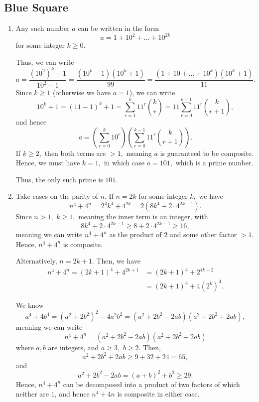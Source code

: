 \documentclass[12pt]{article}
\begin{document}
\subsection{Blue Square}
\begin{enumerate}
  \item[7] Any such number $a$ can be written in the form
    $$
    a = 1 + 10^2 + \ldots + 10^{2k}
    $$
    for some integer $k \geq 0.$

    Thus, we can write
    $$
    a = \dfrac{(10^2)^{k} - 1}{10^{2} - 1} = \dfrac{(10^k - 1)(10^k +
    1)}{99} = \dfrac{(1 + 10 + \ldots + 10^{k})(10^{k} + 1)}{11}.
    $$
    Since $k \geq 1$ (otherwise we have $a = 1$), we can write
    $$
    10^k + 1 = (11 - 1)^k + 1 = \sum_{r = 1}^{k} 11^{r} {k \choose r}
    = 11 \sum_{r = 0}^{k -1 } 11^{r}{k \choose r + 1},
    $$
    and hence
    $$
    a = \left (\sum_{r = 0}^{k} 10^r \right)\left(\sum_{r = 0}^{k-1}
    11^r {k \choose r + 1}\right).
    $$
    If $k \geq 2,$ then both terms are $> 1,$ meaning $a$ is
    guaranteed to be composite. Hence, we must have $k =1,$ in which
    case $a = 101,$ which is a prime number.

    Thus, the only such prime is $101.$

  \item[8] Take cases on the parity of $n.$ If $n = 2k$ for some
    integer $k,$ we have
    $$
    n^4 + 4^n = 2^4 k^4 + 4^{2k} = 2(8k^4 + 2 \cdot 4^{2k - 1}).
    $$
    Since $n > 1,$ $k \geq 1,$ meaning the inner term is an integer, with $$
    8k^4 + 2 \cdot 4^{2k-1} \geq 8 + 2 \cdot 4^{2k-1} \geq 16,
    $$
    meaning we can write $n^4 + 4^n$ as the product of $2$ and some
    other factor $ > 1.$ Hence, $n^4 + 4^n$ is composite.

    Alternatively, $n = 2k + 1.$  Then, we have
    \begin{align*}
      n^4 + 4^n = (2k+1)^4 + 4^{2k + 1} &= (2k + 1)^4 + 2^{4k + 2} \\
      &= (2k+1)^4 + 4 (2^k)^4.
    \end{align*}

    We know
    $$
    a^4 + 4b^4 = (a^2  + 2b^2)^2 -  4a^2b^2 = (a^2 + 2b^2 - 2ab)(a^2
    + 2b^2 + 2ab),
    $$
    meaning we can write
    $$
    n^4 + 4^n = (a^2 + 2b^2 - 2ab)(a^2 + 2b^2 + 2ab)
    $$
    where $a, b$ are integers, and $a\geq 3,$ $b \geq 2.$ Then,
    $$
    a^2 + 2b^2 + 2ab \geq 9 +32 + 24 = 65,
    $$
    and $$
    a^2 + 2b^2 - 2ab = (a+b)^2 + b^2 \geq 29.
    $$
    Hence, $n^4 + 4^n$ can be decomposed into a product of two
    factors of which neither are $1$, and hence $n^4 + 4n$ is
    composite in either case.


\end{enumerate}
\end{document}
